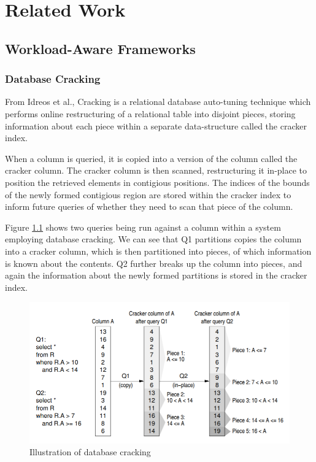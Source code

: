 \chapter{Related Work}

\label{ch:relatedwork}

\section{Workload-Aware Frameworks}

\subsection{Database Cracking}

From Idreos et al., Cracking is a relational database auto-tuning technique which performs online
restructuring of a relational table into disjoint pieces, storing information about each piece within
a separate data-structure called the cracker index.

When a column is queried, it is copied into a version of the column called the cracker column. The
cracker column is then scanned, restructuring it in-place to position the retrieved elements in
contigious positions. The indices of the bounds of the newly formed contigious region are stored
within the cracker index to inform future queries of whether they need to scan that piece of the
column.

Figure \ref{fig:cracking_img} shows two queries being run against a column within a system employing
database cracking. We can see that Q1 partitions copies the column into a cracker column, which is
then partitioned into pieces, of which information is known about the contents. Q2 further breaks
up the column into pieces, and again the information about the newly formed partitions is stored
in the cracker index.

\begin{figure}[h]
  \includegraphics[width=\textwidth]{cracking_img}
  \caption{Illustration of database cracking}
  \label{fig:cracking_img}
\end{figure}

